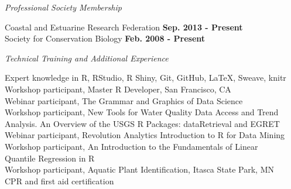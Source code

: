 \documentclass[letterpaper,12pt]{article}
\newcommand{\sectitle}[1]{\vspace{\baselineskip} \centerline{\large{\textit{#1}}}}
\begin{document}
\sectitle{Professional Society Membership}

Coastal and Estuarine Research Federation \hfill {\bf Sep. 2013 - Present} \\
Society for Conservation Biology \hfill {\bf Feb. 2008 - Present} 

\sectitle{Technical Training and Additional Experience}

Expert knowledge in R, RStudio, R Shiny, Git, GitHub, \LaTeX, Sweave, knitr \\
Workshop participant, Master R Developer, San Francisco, CA \\
Webinar participant, The Grammar and Graphics of Data Science \\
Workshop participant, New Tools for Water Quality Data Access and Trend \\ \hspace{0.3in} Analysis. An Overview of the USGS R Packages: dataRetrieval and EGRET\\
Webinar participant, Revolution Analytics Introduction to R for Data Mining \\
Workshop participant, An Introduction to the Fundamentals of Linear \\
\hspace{0.3in}Quantile Regression in R \\
Workshop participant, Aquatic Plant Identification, Itasca State Park, MN \\
CPR and first aid certification
\end{document}
